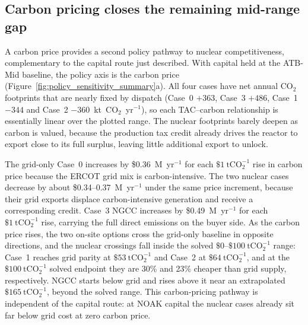 \documentclass[sn-vancouver,Numbered]{sn-jnl}%
\begin{document}
\subsection{Carbon pricing closes the remaining mid-range gap}
\label{sec:results:policy}

A carbon price provides a second policy pathway to nuclear competitiveness, complementary to the capital route just described. With capital held at the ATB-Mid baseline, the policy axis is the carbon price (Figure~\ref{fig:policy_sensitivity_summary}a). All four cases have net annual CO$_2$ footprints that are nearly fixed by dispatch (Case~0 $+363$, Case~3 $+486$, Case~1 $-344$ and Case~2 $-360$~kt~CO$_2$~yr$^{-1}$), so each TAC--carbon relationship is essentially linear over the plotted range. The nuclear footprints barely deepen as carbon is valued, because the production tax credit already drives the reactor to export close to its full surplus, leaving little additional export to unlock.

The grid-only Case~0 increases by \$0.36~M~yr$^{-1}$ for each \(\$1~\mathrm{tCO}_2^{-1}\) rise in carbon price because the ERCOT grid mix is carbon-intensive. The two nuclear cases decrease by about \$0.34--0.37~M~yr$^{-1}$ under the same price increment, because their grid exports displace carbon-intensive generation and receive a corresponding credit. Case~3 NGCC increases by \$0.49~M~yr$^{-1}$ for each \(\$1~\mathrm{tCO}_2^{-1}\) rise, carrying the full direct emissions on the buyer side. As the carbon price rises, the two on-site options cross the grid-only baseline in opposite directions, and the nuclear crossings fall inside the solved \(\$0\)--\(\$100~\mathrm{tCO}_2^{-1}\) range: Case~1 reaches grid parity at \(\$53~\mathrm{tCO}_2^{-1}\) and Case~2 at \(\$64~\mathrm{tCO}_2^{-1}\), and at the \(\$100~\mathrm{tCO}_2^{-1}\) solved endpoint they are 30\% and 23\% cheaper than grid supply, respectively. NGCC starts below grid and rises above it near an extrapolated \(\$165~\mathrm{tCO}_2^{-1}\), beyond the solved range. This carbon-pricing pathway is independent of the capital route: at NOAK capital the nuclear cases already sit far below grid cost at zero carbon price.
\end{document}
